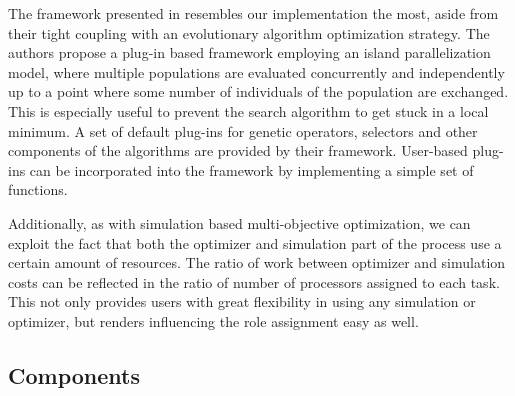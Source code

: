 \documentclass[preprint,linenumbers,amsmath,amssymb,aps,prstab]{revtex4-1}%
\begin{document}
The framework presented in \cite{lems:09} resembles our implementation the
  most, aside from their tight coupling with an evolutionary algorithm
  optimization strategy.
The authors propose a plug-in based framework employing an island
  parallelization model, where multiple populations are evaluated concurrently
  and independently up to a point where some number of individuals of the
  population are exchanged.
This is especially useful to prevent the search algorithm to get stuck in
  a local minimum.
A set of default plug-ins for genetic operators, selectors and other
  components of the algorithms are provided by their framework.
User-based plug-ins can be incorporated into the framework by implementing a
  simple set of functions.

Additionally, as with simulation based multi-objective optimization, we can
  exploit the fact that both the optimizer and simulation part of the process
  use a certain amount of resources.
The ratio of work between optimizer and simulation costs can be reflected in
  the ratio of number of processors assigned to each task.
This not only provides users with  great flexibility in using any simulation
  or optimizer, but renders influencing the role assignment easy as well.


\subsection{Components}
\end{document}
